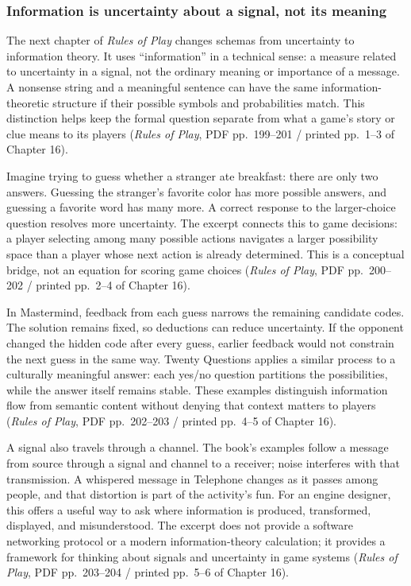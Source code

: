 \subsubsection{Information is uncertainty about a signal, not its meaning}\label{05-engine-i-ch009-information-is-uncertainty-about-a-signal-not-its-meaning}

The next chapter of \emph{Rules of Play} changes schemas from uncertainty to information theory. It uses ``information'' in a technical sense: a measure related to uncertainty in a signal, not the ordinary meaning or importance of a message. A nonsense string and a meaningful sentence can have the same information-theoretic structure if their possible symbols and probabilities match. This distinction helps keep the formal question separate from what a game's story or clue means to its players (\emph{Rules of Play}, PDF pp.~199--201 / printed pp.~1--3 of Chapter 16).

Imagine trying to guess whether a stranger ate breakfast: there are only two answers. Guessing the stranger's favorite color has more possible answers, and guessing a favorite word has many more. A correct response to the larger-choice question resolves more uncertainty. The excerpt connects this to game decisions: a player selecting among many possible actions navigates a larger possibility space than a player whose next action is already determined. This is a conceptual bridge, not an equation for scoring game choices (\emph{Rules of Play}, PDF pp.~200--202 / printed pp.~2--4 of Chapter 16).

In Mastermind, feedback from each guess narrows the remaining candidate codes. The solution remains fixed, so deductions can reduce uncertainty. If the opponent changed the hidden code after every guess, earlier feedback would not constrain the next guess in the same way. Twenty Questions applies a similar process to a culturally meaningful answer: each yes/no question partitions the possibilities, while the answer itself remains stable. These examples distinguish information flow from semantic content without denying that context matters to players (\emph{Rules of Play}, PDF pp.~202--203 / printed pp.~4--5 of Chapter 16).

A signal also travels through a channel. The book's examples follow a message from source through a signal and channel to a receiver; noise interferes with that transmission. A whispered message in Telephone changes as it passes among people, and that distortion is part of the activity's fun. For an engine designer, this offers a useful way to ask where information is produced, transformed, displayed, and misunderstood. The excerpt does not provide a software networking protocol or a modern information-theory calculation; it provides a framework for thinking about signals and uncertainty in game systems (\emph{Rules of Play}, PDF pp.~203--204 / printed pp.~5--6 of Chapter 16).

